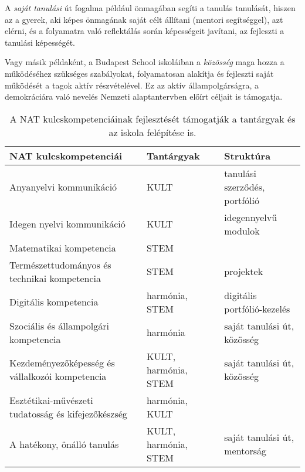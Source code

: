 A \emph{saját tanulási} út fogalma például önmagában segíti a tanulás
tanulását, hiszen az a gyerek, aki képes önmagának saját célt állítani (mentori
segítséggel), azt elérni, és a folyamatra való reflektálás során képességeit
javítani, az fejleszti a tanulási képességét.

Vagy másik példaként, a Budapest School iskoláiban a \emph{közösség} maga hozza
a működéséhez szükséges szabályokat, folyamatosan alakítja és fejleszti saját
működését a tagok aktív részvételével. Ez az aktív állampolgárságra, a
demokráciára való nevelés Nemzeti alaptantervben előírt céljait is támogatja.

\begin{table}
  \centering
  \begin{tabular}{p{5cm}|>{\raggedright}p{3cm}|p{3cm}}

    \textbf{NAT kulcskompetenciái}                     & \textbf{Tantárgyak}  &
    \textbf{Struktúra}                                                                                        \\ \hline
    Anyanyelvi kommunikáció                            &  KULT                & tanulási szerződés, portfólió \\ \hline
    Idegen nyelvi kommunikáció                         & KULT                 & idegennyelvű modulok          \\ \hline
    Matematikai kompetencia                            & STEM                 &                               \\ \hline
    Természettudományos és technikai kompetencia       & STEM                 & projektek                     \\ \hline
    Digitális kompetencia                              & harmónia, STEM       & digitális portfólió-kezelés   \\ \hline
    Szociális és állampolgári kompetencia              & harmónia             & saját tanulási út,
    közösség                                                                                                  \\ \hline
    Kezdeményezőképesség és vállalkozói kompetencia    & KULT, harmónia, STEM & saját
    tanulási út, közösség                                                                                     \\ \hline
    Esztétikai-művészeti tudatosság és kifejezőkészség & harmónia, KULT       &                               \\ \hline
    A hatékony, önálló tanulás                         & KULT, harmónia, STEM & saját tanulási út,
    mentorság                                                                                                 \\

  \end{tabular}
  \caption{A NAT kulcskompetenciáinak fejlesztését támogatják a tantárgyak és
    az iskola felépítése is.}
  \label{tbl:nat_kulcs}
\end{table}